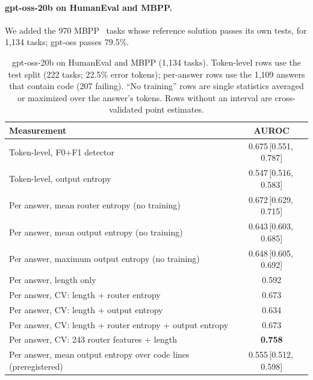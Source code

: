 \documentclass[11pt]{article}
\newcommand{\FZO}{\textsf{F0+F1}}
\newcommand{\ci}[2]{\,[#1,\,#2]}
\begin{document}
\paragraph{gpt-oss-20b on HumanEval and MBPP.}
We added the 970 MBPP~\citep{austin2021program} tasks whose reference solution passes its own tests, for 1,134 tasks; gpt-oss passes 79.5\%.

\begin{table}[t]
\centering
\small
\caption{gpt-oss-20b on HumanEval and MBPP (1,134 tasks). Token-level rows use the test split (222 tasks; 22.5\% error tokens); per-answer rows use the 1,109 answers that contain code (207 failing). ``No training'' rows are single statistics averaged or maximized over the answer's tokens. Rows without an interval are cross-validated point estimates.}
\label{tab:code}
\begin{tabular}{lc}
\toprule
Measurement & AUROC \\
\midrule
Token-level, \FZO{} detector & 0.675\ci{0.551}{0.787} \\
Token-level, output entropy & 0.547\ci{0.516}{0.583} \\
Per answer, mean router entropy (no training) & 0.672\ci{0.629}{0.715} \\
Per answer, mean output entropy (no training) & 0.643\ci{0.603}{0.685} \\
Per answer, maximum output entropy (no training) & 0.648\ci{0.605}{0.692} \\
Per answer, length only & 0.592 \\
Per answer, CV: length + router entropy & 0.673 \\
Per answer, CV: length + output entropy & 0.634 \\
Per answer, CV: length + router entropy + output entropy & 0.673 \\
Per answer, CV: 243 router features + length & \textbf{0.758} \\
Per answer, mean output entropy over code lines (preregistered) & 0.555\ci{0.512}{0.598} \\
\bottomrule
\end{tabular}
\end{table}
\end{document}
